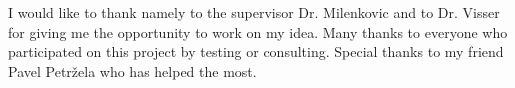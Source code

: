 \begin{dissacknowledgments}
\vspace{-0.4in} 
I would like to thank namely to the supervisor Dr. Milenkovic and to Dr. Visser for giving me the opportunity to work on my idea. Many thanks to everyone who participated on this project by testing or consulting. Special thanks to my friend Pavel Petržela who has helped the most.
\vspace{-0.3in}
\end{dissacknowledgments}

